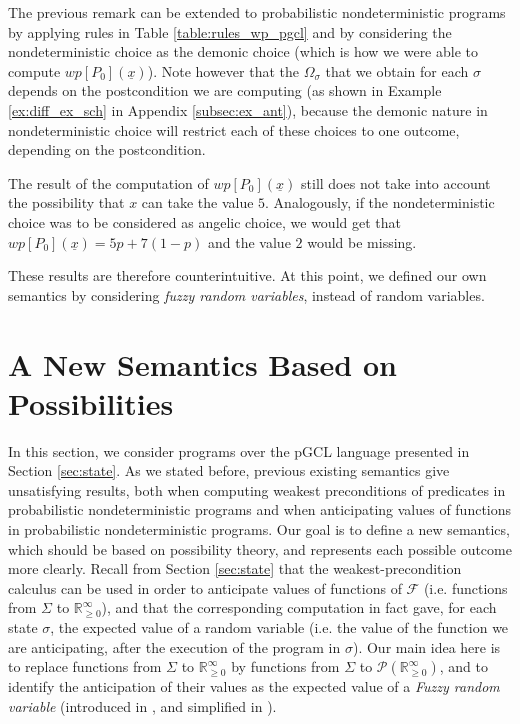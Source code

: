 \documentclass[a4paper,10pt]{llncs}
\def\RRposi {{\mathbb R_{\geq 0}^{\infty}}}
\begin{document}
\begin{remark}
The previous remark can be extended to probabilistic nondeterministic programs by applying rules in Table \ref{table:rules_wp_pgcl} and by considering the nondeterministic choice as the demonic choice (which is how we were able to compute $wp[P_0](\underline{x})$). Note however that the $\Omega_\sigma$ that we obtain for each $\sigma$ depends on the postcondition we are computing (as shown in Example \ref{ex:diff_ex_sch} in Appendix \ref{subsec:ex_ant}), because the demonic nature in nondeterministic choice will restrict each of these choices to one outcome, depending on the postcondition.
\end{remark}
\begin{remark}
The result of the computation of $wp[P_0](\underline{x})$ still does not take into account the possibility that $x$ can take the value $5$.
Analogously, if the nondeterministic choice was to be considered as angelic choice, we would get that $wp[P_0](\underline{x}) = 5p+7(1-p)$ and the value $2$ would be missing.
\end{remark}

These results are therefore counterintuitive. At this point, we defined our own semantics by considering \emph{fuzzy random variables}, instead of random variables.
	

\section{A New Semantics Based on Possibilities}
\label{sec:contribution}

In this section, we consider programs over the pGCL language presented in Section \ref{sec:state}. As we stated before, previous existing semantics give unsatisfying results, both when computing weakest preconditions of predicates in probabilistic nondeterministic programs and when anticipating values of functions in probabilistic nondeterministic programs. Our goal is to define a new semantics, which should be based on possibility theory, and represents each possible outcome more clearly.  Recall from Section \ref{sec:state} that the weakest-precondition calculus can be used in order to anticipate values of functions of $\mathcal{F}$ (i.e. functions from $\Sigma$ to $\RRposi$), and that the corresponding computation in fact gave, for each state $\sigma$, the expected value of a random variable (i.e. the value of the function we are anticipating, after the execution of the program in $\sigma$). Our main idea here is to replace functions from $\Sigma$ to $\RRposi$ by functions from $\Sigma$ to $\mathcal{P}(\RRposi)$, and to identify the anticipation of their values as the expected value of a \textit{Fuzzy random variable} (introduced in \cite{PuriRal86}, and simplified in \cite{Shapiro09}).
\end{document}
